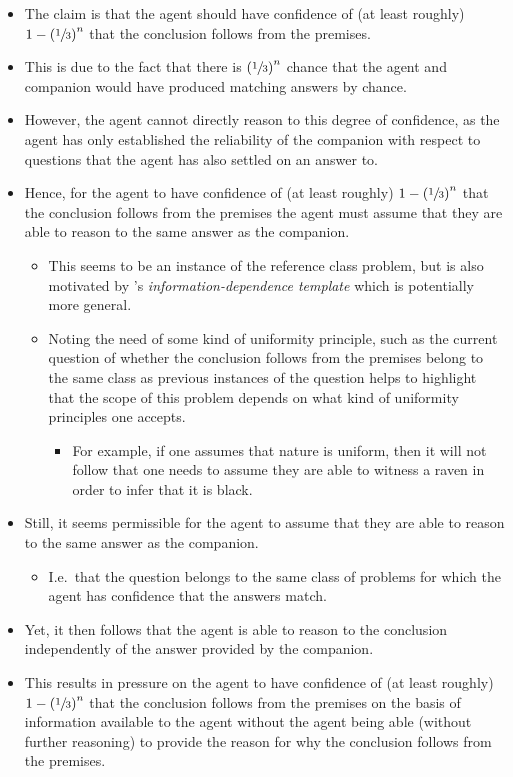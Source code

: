 \documentclass[10pt]{article}
\begin{document}
\begin{itemize}
\item The claim is that the agent should have confidence of (at least roughly) \(1 - \left(\sfrac{1}{3}\right)^{n}\) that the conclusion follows from the premises.
\item This is due to the fact that there is \(\left(\sfrac{1}{3}\right)^{n}\) chance that the agent and companion would have produced matching answers by chance.
\item However, the agent cannot directly reason to this degree of confidence, as the agent has only established the reliability of the companion with respect to questions that the agent has also settled on an answer to.
\item Hence, for the agent to have confidence of (at least roughly) \(1 - \left(\sfrac{1}{3}\right)^{n}\) that the conclusion follows from the premises the agent must assume that they are able to reason to the same answer as the companion.
  \begin{itemize}
  \item This seems to be an instance of the reference class problem, but is also motivated by \citeauthor{Wright:2003aa}'s \emph{information-dependence template} which is potentially more general.
  \item Noting the need of some kind of uniformity principle, such as the current question of whether the conclusion follows from the premises belong to the same class as previous instances of the question helps to highlight that the scope of this problem depends on what kind of uniformity principles one accepts.
    \begin{itemize}
    \item For example, if one assumes that nature is uniform, then it will not follow that one needs to assume they are able to witness a raven in order to infer that it is black.
    \end{itemize}
  \end{itemize}
\item Still, it seems permissible for the agent to assume that they are able to reason to the same answer as the companion.
  \begin{itemize}
  \item I.e.\ that the question belongs to the same class of problems for which the agent has confidence that the answers match.
  \end{itemize}
\item Yet, it then follows that the agent is able to reason to the conclusion independently of the answer provided by the companion.
\item This results in pressure on the agent to have confidence of (at least roughly) \(1 - \left(\sfrac{1}{3}\right)^{n}\) that the conclusion follows from the premises on the basis of information available to the agent without the agent being able (without further reasoning) to provide the reason for why the conclusion follows from the premises.
\end{itemize}
\end{document}
